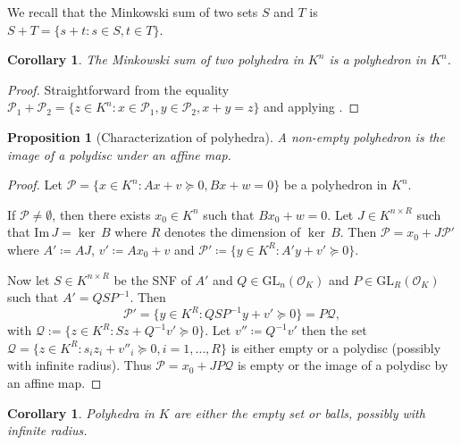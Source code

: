 \documentclass[sigconf]{acmart}
\newcommand{\PP}{\mathcal{P}}
\newtheorem{proposition}[theorem]{Proposition}
\newtheorem{corollary}[theorem]{Corollary}
\newcommand{\GL}{\mathrm{GL}}
\providecommand{\DIFaddtex}[1]{{\protect\color{blue}\uwave{#1}}} %
\providecommand{\DIFdeltex}[1]{{\protect\color{red}\sout{#1}}}                      %
\providecommand{\DIFaddbegin}{} %
\providecommand{\DIFaddend}{} %
\providecommand{\DIFdelbegin}{} %
\providecommand{\DIFdelend}{} %
\providecommand{\DIFadd}[1]{\texorpdfstring{\DIFaddtex{#1}}{#1}} %
\providecommand{\DIFdel}[1]{\texorpdfstring{\DIFdeltex{#1}}{}} %
\newcommand{\DIFscaledelfig}{0.5}
\newlength{\DIFdelgraphicswidth} %
\newlength{\DIFdelgraphicsheight} %
\newcommand{\DIFaddincludegraphics}[2][]{{\color{blue}\fbox{\DIFOincludegraphics[#1]{#2}}}} %
\newcommand{\DIFdelincludegraphics}[2][]{%
\sbox{\DIFdelgraphicsbox}{\DIFOincludegraphics[#1]{#2}}%
\settoboxwidth{\DIFdelgraphicswidth}{\DIFdelgraphicsbox} %
\settoboxtotalheight{\DIFdelgraphicsheight}{\DIFdelgraphicsbox} %
\scalebox{\DIFscaledelfig}{%
\parbox[b]{\DIFdelgraphicswidth}{\usebox{\DIFdelgraphicsbox}\\[-\baselineskip] \rule{\DIFdelgraphicswidth}{0em}}\llap{\resizebox{\DIFdelgraphicswidth}{\DIFdelgraphicsheight}{%
\setlength{\unitlength}{\DIFdelgraphicswidth}%
\begin{picture}(1,1)%
\thicklines\linethickness{2pt} %
{\color[rgb]{1,0,0}\put(0,0){\framebox(1,1){}}}%
{\color[rgb]{1,0,0}\put(0,0){\line( 1,1){1}}}%
{\color[rgb]{1,0,0}\put(0,1){\line(1,-1){1}}}%
\end{picture}%
}\hspace*{3pt}}} %
} %
\DeclareRobustCommand{\DIFaddbegin}{\DIFOaddbegin \let\includegraphics\DIFaddincludegraphics} %
\DeclareRobustCommand{\DIFaddend}{\DIFOaddend \let\includegraphics\DIFOincludegraphics} %
\DeclareRobustCommand{\DIFdelbegin}{\DIFOdelbegin \let\includegraphics\DIFdelincludegraphics} %
\DeclareRobustCommand{\DIFdelend}{\DIFOaddend \let\includegraphics\DIFOincludegraphics} %
\begin{document}
We recall that the Minkowski sum of two sets $S$ and $T$ is $S+T = \{s+t : s \in S, t \in T\}$.

\begin{corollary}
The Minkowski sum of two polyhedra in $K^n$ is a polyhedron in $K^n$.
\end{corollary}
\begin{proof}
  Straightforward from the equality
  $\PP_1 + \PP_2 = \{z \in K^n : x \in \PP_1, y \in \PP_2, x+y=z\}$
  and applying .
\end{proof}

\begin{proposition}[Characterization of polyhedra] \label{prop:carac}
    A non-empty polyhedron is the image of a polydisc under an affine map.
\end{proposition}
\begin{proof}
    Let $\PP = \{x \in K^n : Ax+v \succeq 0, Bx + w = 0\}$ be a polyhedron in $K^n$.
    \DIFdelbegin %

\DIFdelend If $\PP \neq \emptyset$, then there exists $x_0 \in K^n$ such that $Bx_0+w=0$.
    Let $J \in K^{n \times R}$ such that \DIFdelbegin \DIFdel{$\textrm{Im}\,J = \ker\,B$ }\DIFdelend \DIFaddbegin \DIFadd{$\mathrm{Im}\,J = \ker\,B$ }\DIFaddend where $R$ denotes
    the dimension of $\ker\,B$. Then $\PP = x_0 + J\PP'$ where
    $A' \coloneq AJ$, $v' \coloneq Ax_0 + v$ and
    $\PP' \coloneq \{y \in K^R : A'y + v' \succeq 0 \}$.

    Now let $S \in K^{n\times R}$ be the SNF of $A'$ and $Q \in \GL_n\left(\mathcal{O}_K\right)$
    and $P \in \GL_R(\mathcal{O}_K)$ such that $A'= Q S P^{-1}$.
    Then
    $$
    \PP' = \{y \in K^R : QSP^{-1}y + v' \succeq 0\} = P \mathcal{Q},
    $$
    with $\mathcal{Q} := \{z \in K^R : Sz + Q^{-1}v' \succeq 0 \}$.
    Let $v'' \coloneq Q^{-1}v'$ then the set
    $\mathcal{Q} = \{z \in K^R : s_i z_i + v''_i \succeq 0, i= 1,\ldots,R\}$
    is either empty or a polydisc (possibly with infinite radius).
    Thus $\PP = x_0+JP\mathcal{Q}$ is empty or the image of a polydisc by an affine map.
\end{proof}

\begin{corollary} \label{cor:caracdim1}
   Polyhedra in $K$ are either the empty set or balls, possibly with infinite radius.
\end{corollary}
\end{document}
